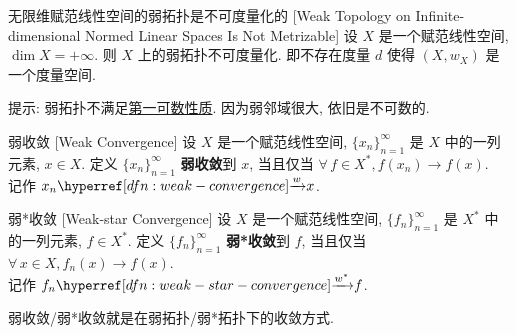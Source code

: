         \begin{thm}
            {无限维赋范线性空间的弱拓扑是不可度量化的}
            [Weak Topology on Infinite-dimensional Normed Linear Spaces Is Not Metrizable]
            设 \(X\) 是一个赋范线性空间, \(\dim X = +\infty\). 则 \(X\) 上的弱拓扑不可度量化. 即不存在度量 \(d\) 使得 \((X, w_X)\) 是一个度量空间.
        \end{thm}

        \begin{prf}
            提示: 弱拓扑不满足\hyperref[dfn:first-countable]{第一可数性质}. 因为弱邻域很大, 依旧是不可数的.
        \end{prf}

        \begin{dfn}
            {弱收敛}
            [Weak Convergence]
            设 \(X\) 是一个赋范线性空间, \(\{x_n\}_{n=1}^{\infty}\) 是 \(X\) 中的一列元素, \(x\in X\). 定义 \(\{x_n\}_{n=1}^{\infty}\) \textbf{弱收敛}到 \(x\), 当且仅当 \(\forall\,f\in X^*, f(x_n)\to f(x)\).\\
            记作 \(x_n\wlim x\).
        \end{dfn}

        \begin{dfn}
            {弱*收敛}
            [Weak-star Convergence]
            设 \(X\) 是一个赋范线性空间, \(\{f_n\}_{n=1}^{\infty}\) 是 \(X^*\) 中的一列元素, \(f\in X^*\). 定义 \(\{f_n\}_{n=1}^{\infty}\) \textbf{弱*收敛}到 \(f\), 当且仅当 \(\forall\,x\in X, f_n(x)\to f(x)\).\\
            记作 \(f_n\wslim f\).
        \end{dfn}

        \begin{rmk}
            [Dedicatia]
            弱收敛/弱*收敛就是在弱拓扑/弱*拓扑下的收敛方式.
        \end{rmk}


